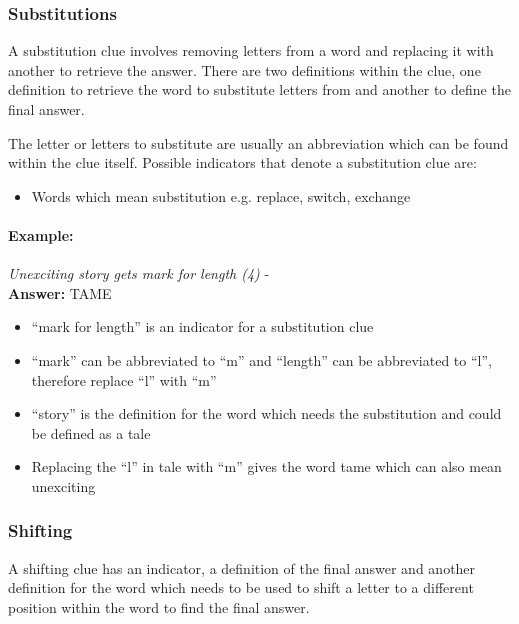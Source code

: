 \subsubsection{Substitutions}

A substitution clue involves removing letters from a word and replacing it with
another to retrieve the answer. There are two definitions within the clue, one
definition to retrieve the word to substitute letters from and another to define
the final answer.

The letter or letters to substitute are usually an abbreviation which can be
found within the clue itself. Possible indicators that denote a substitution 
clue are:

\begin{itemize} 
  \item Words which mean substitution e.g. replace, switch, exchange
\end{itemize}

\paragraph{Example:} \emph{Unexciting story gets mark for length (4)} - \citep{shuchiSubstitutions08} \\
\textbf{Answer:} TAME 

\begin{itemize}
  \item ``mark for length'' is an indicator for a substitution clue  
  \item ``mark'' can be abbreviated to ``m'' and ``length'' can be 
        abbreviated to ``l'', therefore replace ``l'' with ``m''
  \item ``story'' is the definition for the word which needs the substitution
        and could be defined as a tale 
  \item Replacing the ``l'' in tale with ``m'' gives the word tame which can
        also mean unexciting 
\end{itemize}


\subsubsection{Shifting}

A shifting clue has an indicator, a definition of the final answer and another
definition for the word which needs to be used to shift a letter to a different
position within the word to find the final answer.

